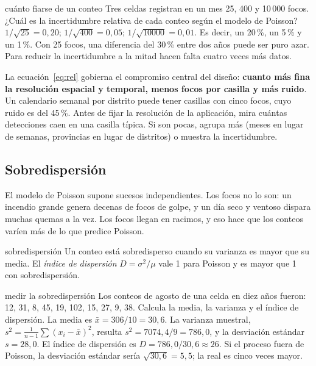 \begin{ejemplo}{cuánto fiarse de un conteo}
Tres celdas registran en un mes 25, 400 y 10\,000 focos. ¿Cuál es la incertidumbre relativa de
cada conteo según el modelo de Poisson?
\solucion $1/\sqrt{25} = 0{,}20$; $1/\sqrt{400} = 0{,}05$; $1/\sqrt{10000} = 0{,}01$. Es decir,
un 20\,{}\%, un 5\,{}\% y un 1\,{}\%. Con 25 focos, una diferencia del 30\,{}\% entre dos años puede
ser puro azar. Para reducir la incertidumbre a la mitad hacen falta cuatro veces más datos.
\end{ejemplo}

\begin{parareto}
La ecuación~\eqref{eq:rel} gobierna el compromiso central del diseño: \textbf{cuanto más fina la
resolución espacial y temporal, menos focos por casilla y más ruido}. Un calendario semanal por
distrito puede tener casillas con cinco focos, cuyo ruido es del 45\,{}\%. Antes de fijar la
resolución de la aplicación, mira cuántas detecciones caen en una casilla típica. Si son pocas,
agrupa más (meses en lugar de semanas, provincias en lugar de distritos) o muestra la
incertidumbre.
\end{parareto}

\subsection{Sobredispersión}

El modelo de Poisson supone sucesos independientes. Los focos no lo son: un incendio grande
genera decenas de focos de golpe, y un día seco y ventoso dispara muchas quemas a la vez. Los
focos llegan en racimos, y eso hace que los conteos varíen más de lo que predice Poisson.

\begin{definicion}{sobredispersión}
Un conteo está sobredisperso cuando su varianza es mayor que su media. El \emph{índice de
dispersión} $D = \sigma^2/\mu$ vale 1 para Poisson y es mayor que 1 con sobredispersión.
\end{definicion}

\begin{ejemplo}{medir la sobredispersión}
Los conteos de agosto de una celda en diez años fueron: 12, 31, 8, 45, 19, 102, 15, 27, 9, 38.
Calcula la media, la varianza y el índice de dispersión.
\solucion La media es $\bar{x} = 306/10 = 30{,}6$. La varianza muestral,
$s^2 = \frac{1}{n-1}\sum (x_i - \bar{x})^2$, resulta $s^2 = 7074{,}4/9 = 786{,}0$, y la
desviación estándar $s = 28{,}0$. El índice de dispersión es $D = 786{,}0/30{,}6 \approx 26$.
Si el proceso fuera de Poisson, la desviación estándar sería $\sqrt{30{,}6} = 5{,}5$; la real es
cinco veces mayor.
\end{ejemplo}

